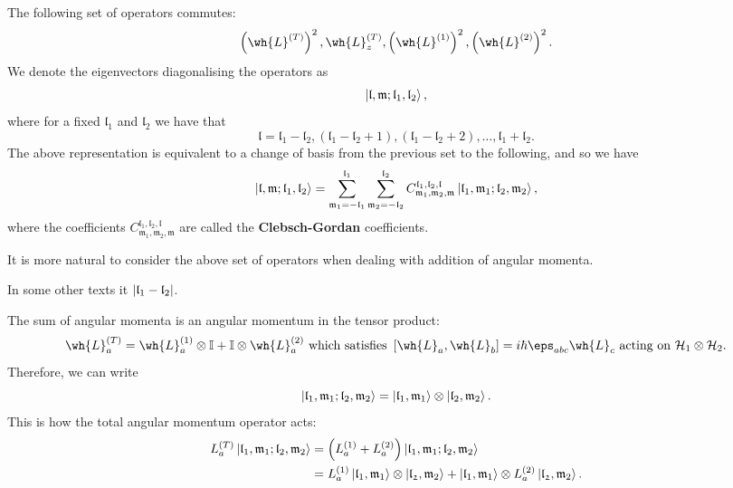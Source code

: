 \documentclass[12pt, a4paper]{article}
\newcommand{\hilbert}{\mathcal H}
\begin{document}
\begin{mdprop}
    The following set of operators commutes:
    \[\left( \wh{L}^{(T)} \right)^2, \wh{L}_z^{(T)},\left( \wh{L}^{(1)} \right)^2, \left( \wh{L}^{(2)} \right)^2.\]
    We denote the eigenvectors diagonalising the operators as 
    \[\ket{\mathfrak{l},\mathfrak{m}; \mathfrak{l}_1,\mathfrak{l}_2},\]
    where for a fixed \(\mathfrak{l}_1\) and \(\mathfrak{l}_2\) we have that 
    \[\mathfrak{l} = \mathfrak{l}_1-\mathfrak{l}_2, \left( \mathfrak{l}_1-\mathfrak{l}_2+1 \right), \left( \mathfrak{l}_1-\mathfrak{l}_2+2 \right), \ldots,\mathfrak{l}_1+\mathfrak{l}_2.\]
    The above representation is equivalent to a change of basis from the previous set to the following, and so we have 
    \[\ket{\mathfrak{l},\mathfrak{m};\mathfrak{l}_1,\mathfrak{l}_2} = \sum_{\mathfrak{m}_1=-\mathfrak{l}_1}^{\mathfrak{l}_1} \sum_{\mathfrak{m}_2=-\mathfrak{l}_2}^{\mathfrak{l}_2} C^{\mathfrak{l}_1,\mathfrak{l}_2,\mathfrak{l}}_{\mathfrak{m}_1,\mathfrak{m}_2,\mathfrak{m}} \ket{\mathfrak{l}_1,\mathfrak{m}_1;\mathfrak{l}_2,\mathfrak{m}_2},\]
    where the coefficients \(C^{\mathfrak{l}_1,\mathfrak{l}_2,\mathfrak{l}}_{\mathfrak{m}_1,\mathfrak{m}_2,\mathfrak{m}}\) are called the \textbf{Clebsch-Gordan} coefficients.
\end{mdprop}

\begin{mdnote}
    It is more natural to consider the above set of operators when dealing with addition of angular momenta.
\end{mdnote}

\begin{mdnote}
    In some other texts it \(\abs{\mathfrak{l}_1-\mathfrak{l}_2}\).
\end{mdnote}

\begin{mdprop}
    The sum of angular momenta is an angular momentum in the tensor product:
    \[\wh{L}_a^{(T)} = \wh{L}_a^{(1)} \otimes \mathbb{I} + \mathbb{I} \otimes \wh{L}_a^{(2)} \text{ which satisfies } \left[ \wh{L}_a,\wh{L}_b \right] = i\hbar \eps_{abc} \wh{L}_c \text{ acting on } \hilbert_1 \otimes \hilbert_2.\]
    Therefore, we can write 
    \[\ket{\mathfrak{l}_1,\mathfrak{m}_1;\mathfrak{l}_2,\mathfrak{m}_2} = \ket{\mathfrak{l}_1,\mathfrak{m}_1} \otimes \ket{\mathfrak{l}_2,\mathfrak{m}_2}.\]
    This is how the total angular momentum operator acts:
    \[\begin{aligned}
        L_a^{(T)} \ket{\mathfrak{l}_1,\mathfrak{m}_1;\mathfrak{l}_2,\mathfrak{m}_2}  &= \left( L_a^{(1)}+L_a^{(2)} \right)\ket{\mathfrak{l}_1,\mathfrak{m}_1;\mathfrak{l}_2,\mathfrak{m}_2}  \\
        &=L_a^{(1)} \ket{\mathfrak{l}_1,\mathfrak{m}_1} \otimes \ket{\mathfrak{l_2},\mathfrak{m}_2}+\ket{\mathfrak{l}_1,\mathfrak{m}_1} \otimes L_a^{(2)} \ket{\mathfrak{l_2},\mathfrak{m}_2}.
    \end{aligned}\]
\end{mdprop}
\end{document}
